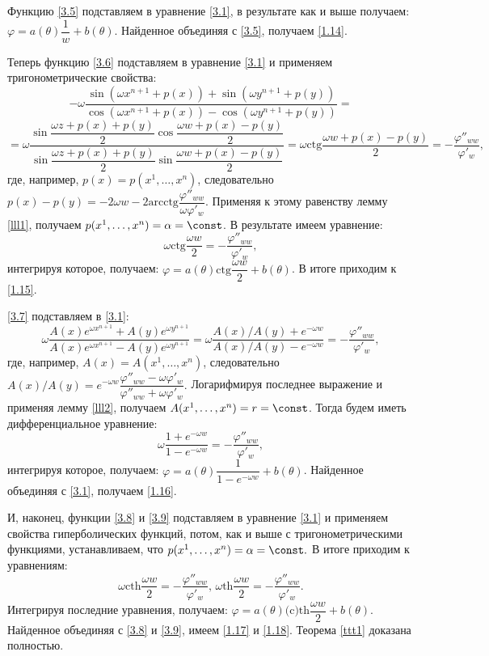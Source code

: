Функцию \eqref{3.5} подставляем в уравнение \eqref{3.1}, в результате как и выше получаем: $\varphi = a(\theta)\dfrac{1}{w} + b(\theta)$. Найденное объединяя с \eqref{3.5}, получаем \eqref{1.14}.

Теперь функцию \eqref{3.6} подставляем в уравнение \eqref{3.1} и применяем тригонометрические свойства: $$ -\omega\dfrac{\sin(\omega x^{n+1} + p(x)) + \sin(\omega y^{n+1} + p(y))}{\cos(\omega x^{n+1} + p(x)) - \cos(\omega y^{n+1} + p(y))} = $$$$= \omega\dfrac{\sin\dfrac{\omega z + p(x) + p(y)}{2}\cos\dfrac{\omega w + p(x) - p(y)}{2}}{\sin\dfrac{\omega z + p(x) + p(y)}{2}\sin\dfrac{\omega w + p(x) - p(y)}{2}} = \omega\text{ctg}\dfrac{\omega w + p(x) - p(y)}{2} = -\dfrac{\varphi''_{ww}}{\varphi'_{w}}, $$
где, например, $p(x) = p(x^1,\ldots,x^n)$, следовательно
$p(x) - p(y) = -2\omega w - 2\text{arcctg}\dfrac{\varphi''_{ww}}{\omega\varphi'_w}.$
Применяя к этому равенству лемму \eqref{lll1}, получаем $p(x^1,\ldots,x^n) = \alpha = \const$. В результате имеем уравнение:
$$ \omega\text{ctg}\dfrac{\omega w}{2} = - \dfrac{\varphi''_{ww}}{\varphi'_{w}}, $$
интегрируя которое, получаем: $\varphi = a(\theta)\text{ctg}\dfrac{\omega w}{2} + b(\theta)$. В итоге приходим к \eqref{1.15}.

\eqref{3.7} подставляем в  \eqref{3.1}: $$  \omega\dfrac{A(x)e^{\omega x^{n+1}} + A(y)e^{\omega y^{n+1}}}{A(x)e^{\omega x^{n+1}} - A(y)e^{\omega y^{n+1}}} = \omega\dfrac{A(x)/A(y) + e^{-\omega w}}{A(x)/A(y) - e^{-\omega w}} = -\dfrac{\varphi''_{ww}}{\varphi'_{w}}, $$
где, например, $A(x) = A(x^1,\ldots,x^n)$, следовательно
$A(x)/A(y) = e^{-\omega w}\dfrac{\varphi''_{ww} - \omega\varphi'_{w}}{\varphi''_{ww} + \omega\varphi'_{w}}.$
Логарифмируя последнее выражение и применяя лемму \eqref{lll2}, получаем $A(x^1,\ldots,x^n) = r = \const$. Тогда будем иметь дифференциальное уравнение:
$$ \omega\dfrac{1+e^{-\omega w}}{1-e^{-\omega w}} = - \dfrac{\varphi''_{ww}}{\varphi'_{w}}, $$
интегрируя которое, получаем: $\varphi = a(\theta)\dfrac{1}{1-e^{-\omega w}} + b(\theta)$. Найденное объединяя с \eqref{3.1}, получаем \eqref{1.16}.


И, наконец, функции \eqref{3.8} и \eqref{3.9} подставляем в уравнение \eqref{3.1} и применяем свойства гиперболических функций, потом, как и выше с тригонометрическими функциями, устанавливаем, что $p(x^1,\ldots,x^n) = \alpha = \const.$ В итоге приходим к уравнениям:
$$ \omega\text{cth}\dfrac{\omega w}{2} = - \dfrac{\varphi''_{ww}}{\varphi'_{w}},\,\omega\text{th}\dfrac{\omega w}{2} = - \dfrac{\varphi''_{ww}}{\varphi'_{w}}. $$
Интегрируя последние уравнения, получаем: $\varphi = a(\theta)\text{(c)th}\dfrac{\omega w}{2} + b(\theta)$. Найденное объединяя с \eqref{3.8} и \eqref{3.9}, имеем \eqref{1.17} и \eqref{1.18}. Теорема \ref{ttt1} доказана полностью.


